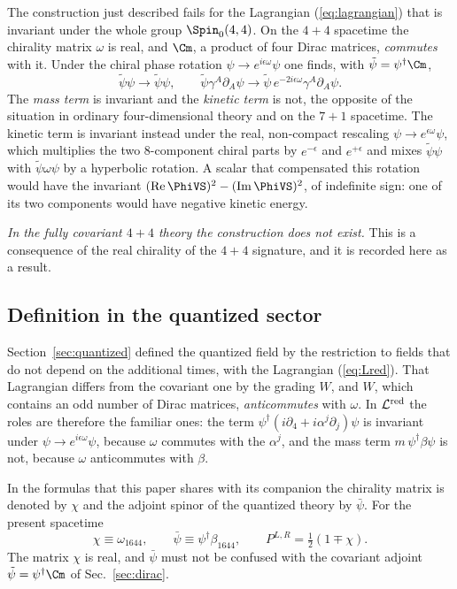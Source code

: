 The construction just described fails for the Lagrangian (\ref{eq:lagrangian}) that is invariant
under the whole group $\Spin_0(4,4)$. On the $4+4$ spacetime the chirality matrix $\omega$ is real,
and $\Cm$, a product of four Dirac matrices, \emph{commutes} with it. Under the chiral phase rotation
$\psi\to e^{i\epsilon\omega}\psi$ one finds, with $\tilde\psi=\psi^\dagger\Cm$,
\begin{equation}
\tilde\psi\psi\to\tilde\psi\psi,\qquad
\tilde\psi\gamma^A\partial_A\psi\to\tilde\psi\,e^{-2i\epsilon\omega}\gamma^A\partial_A\psi .
\end{equation}
The \emph{mass term} is invariant and the \emph{kinetic term} is not, the opposite of the situation in
ordinary four-dimensional theory and on the $7+1$ spacetime. The kinetic term is invariant instead
under the real, non-compact rescaling $\psi\to e^{\epsilon\omega}\psi$, which multiplies the two
8-component chiral parts by $e^{-\epsilon}$ and $e^{+\epsilon}$ and mixes $\tilde\psi\psi$ with
$\tilde\psi\omega\psi$ by a hyperbolic rotation. A scalar that compensated this rotation would have
the invariant $(\mathrm{Re}\,\PhiVS)^2-(\mathrm{Im}\,\PhiVS)^2$, of indefinite sign: one of its two
components would have negative kinetic energy.

\emph{In the fully covariant $4+4$ theory the construction does not exist.} This is a consequence of
the real chirality of the $4+4$ signature, and it is recorded here as a result.

\subsection{Definition in the quantized sector}
\label{sec:vsdef}

Section~\ref{sec:quantized} defined the quantized field by the restriction to fields that do not
depend on the additional times, with the Lagrangian (\ref{eq:Lred}). That Lagrangian differs from the
covariant one by the grading $W$, and $W$, which contains an odd number of Dirac matrices,
\emph{anticommutes} with $\omega$. In $\mathcal L^{\rm red}$ the roles are therefore the familiar
ones: the term $\psi^\dagger(i\partial_4+i\alpha^j\partial_j)\psi$ is invariant under
$\psi\to e^{i\epsilon\omega}\psi$, because $\omega$ commutes with the $\alpha^j$, and the mass term
$m\,\psi^\dagger\beta\psi$ is not, because $\omega$ anticommutes with $\beta$.

In the formulas that this paper shares with its companion the chirality matrix is denoted by $\chi$
and the adjoint spinor of the quantized theory by $\bar\psi$. For the present spacetime
\begin{equation}
\chi\equiv\omega_{1644},\qquad\bar\psi\equiv\psi^\dagger\beta_{1644},\qquad P^{L,R}=\tfrac12(1\mp\chi).
\label{eq:chi}
\end{equation}
The matrix $\chi$ is real, and $\bar\psi$ must not be confused with the covariant adjoint
$\tilde\psi=\psi^\dagger\Cm$ of Sec.~\ref{sec:dirac}.

